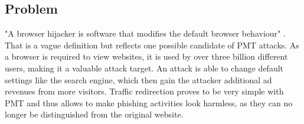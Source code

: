 \subsection{Problem}
"A browser hijacker is software that modifies the default browser behaviour" \cite{automatedspywarecollection}. That is a  vague definition but reflects one possible candidate of \gls{PMT} attacks. As a browser is required to view websites, it is used by over three billion \cite{cia} different users, making it a valuable attack target. An attack is able to change default settings like the search engine, which then gain the attacker additional ad revenues from more visitors. Traffic redirection proves to be very simple with \gls{PMT} and thus allows to make phishing activities look harmless, as they can no longer be distinguished from the original website.